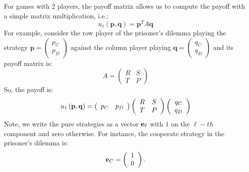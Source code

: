 \begin{rem}
For games with 2 players, the payoff matrix allows us to compute the
payoff with a simple matrix multiplication, i.e.:
\[
u_{\ell}\left(\mathbf{p},\mathbf{q}\right)=\mathbf{p}{}^{T}A\mathbf{q}
\]
For example, consider the row player of the prisoner's dilemma playing
the strategy $\mathbf{p}=\left(\begin{array}{c}
p_{C}\\
p_{D}
\end{array}\right)$ against the column player playing $\mathbf{q}=\left(\begin{array}{c}
q_{C}\\
q_{D}
\end{array}\right)$ and its payoff matrix is:
\[
A=\left(\begin{array}{cc}
R & S\\
T & P
\end{array}\right)
\]
So, the payoff is:
\[
u_{1}\left({\bf p},{\bf q}\right)=\left(\begin{array}{cc}
p_{C} & p_{D}\end{array}\right)\left(\begin{array}{cc}
R & S\\
T & P
\end{array}\right)\left(\begin{array}{c}
q_{C}\\
q_{D}
\end{array}\right)
\]
 Note, we write the pure strategies as a vector ${\bf e_{\ell}}$
with $1$ on the $\ell-th$ component and zero otherwise. For instance,
the cooperate strategy in the prisoner's dilemma is:
\[
{\bf e}_{C}=\left(\begin{array}{c}
1\\
0
\end{array}\right).
\]
\end{rem}

